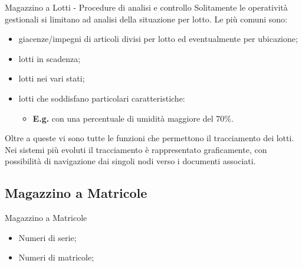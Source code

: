\documentclass{beamer}
\begin{document}
\begin{frame}{Magazzino a Lotti - Procedure di analisi e controllo}
    Solitamente le operatività gestionali si limitano ad analisi della situazione per lotto. Le più comuni sono:
    \begin{itemize}
        \item giacenze/impegni di articoli divisi per lotto ed eventualmente per ubicazione;
        \item lotti in scadenza;
        \item lotti nei vari stati;
        \item lotti che soddisfano particolari caratteristiche:
        \begin{itemize}
            \item \textbf{E.g.} con una percentuale di umidità maggiore del 70\%.
        \end{itemize}
    \end{itemize}
    Oltre a queste vi sono tutte le funzioni che permettono il tracciamento dei lotti. Nei sistemi più evoluti il tracciamento è rappresentato graficamente, con possibilità di navigazione dai singoli nodi verso i documenti associati.
\end{frame}

\subsection{Magazzino a Matricole}
\begin{frame}{Magazzino a Matricole}
    \begin{itemize}
        \item Numeri di serie;
        \item Numeri di matricole;
    \end{itemize}
\end{frame}
\end{document}
